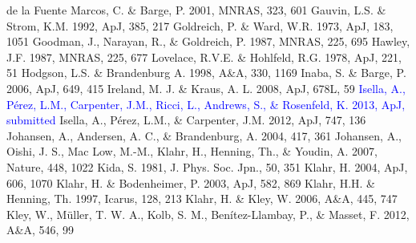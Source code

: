 \documentclass[apj]{emulateapj}
\def\blue#1{\textcolor{blue}{ #1}}
\begin{document}
\begin{thebibliography}{}
 de la Fuente Marcos, C. \& Barge, P. 2001, MNRAS, 323, 601 
 Gauvin, L.S. \& Strom, K.M. 1992, ApJ, 385, 217
 Goldreich, P. \& Ward, W.R. 1973, ApJ, 183, 1051
 Goodman, J., Narayan, R., \& Goldreich, P. 1987, MNRAS, 225, 695
 Hawley, J.F. 1987, MNRAS, 225, 677
  Lovelace, R.V.E. \& Hohlfeld, R.G. 1978, ApJ, 221, 51
 Hodgson, L.S. \& Brandenburg A. 1998, A\&A, 330, 1169
 Inaba, S. \& Barge, P. 2006, ApJ, 649, 415
 Ireland, M. J. \& Kraus, A. L. 2008, ApJ, 678L, 59
\bibitem[{{\blue{Isella et al.}}(2013)}]{Isella13} \blue{Isella, A., P\'erez, L.M., Carpenter, J.M., Ricci, L., Andrews, S., \& Rosenfeld, K. 2013, ApJ, submitted}
 Isella, A., P\'erez, L.M., \& Carpenter, J.M. 2012, ApJ, 747, 136
 Johansen, A., Andersen, A. C., \& Brandenburg, A. 2004, 417, 361
 Johansen, A., Oishi, J. S., Mac Low, M.-M., Klahr, H., Henning, Th., \& Youdin, A. 2007, Nature, 448, 1022
 Kida, S. 1981, J. Phys. Soc. Jpn.,  50, 351
 Klahr, H. 2004, ApJ, 606, 1070
 Klahr, H. \& Bodenheimer, P. 2003, ApJ, 582, 869
 Klahr, H.H. \& Henning, Th. 1997, Icarus, 128, 213
 Klahr, H. \& Kley, W. 2006, A\&A, 445, 747
 Kley, W., M\"uller, T. W. A., Kolb, S. M., Ben\'itez-Llambay, P., \& Masset, F. 2012, A\&A, 546, 99

\end{thebibliography}
\end{document}
